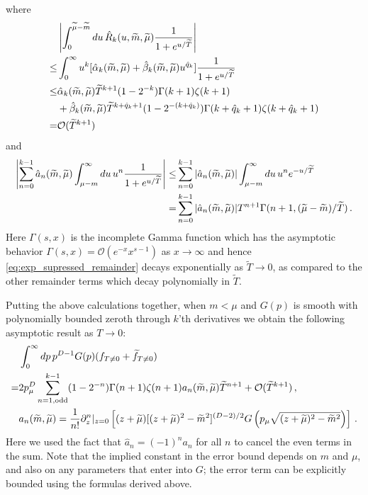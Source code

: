 \documentclass[sn-mathphys,Numbered]{sn-jnl}
\newcommand{\wt}[1]{\widetilde{#1}}
\begin{document}
where
\begin{align}
&\left|\int_0^{\wt{\mu}-\wt{m}} du\, \hat{R}_k(u,\wt{m},\wt{\mu})\frac{1}{1+e^{u/\wt{T}}}\right|\\
\leq &\int_0^\infty u^k[\hat{\alpha}_k(\wt{m},\wt{\mu})+\hat{\beta}_k(\wt{m},\wt{\mu}) u^{\hat{q}_k}]\frac{1}{1+e^{u/\wt{T}}}\notag\\
\leq&\hat{\alpha}_k(\wt{m},\wt{\mu}) \wt{T}^{k+1}(1-2^{-k})\Gamma(k+1)\zeta(k+1)\notag\\
  &+\hat{\beta}_k(\wt{m},\wt{\mu}) \wt{T}^{k+\hat{q}_k+1}(1-2^{-(k+\hat{q}_k)})\Gamma(k+\hat{q}_k+1)\zeta(k+\hat{q}_k+1) \notag\\
  =&\mathcal{O}(\wt{T}^{k+1})\notag
\end{align}
and
\begin{align}\label{eq:exp_supressed_remainder}
\left|\sum_{n=0}^{k-1} \hat{a}_{n}(\wt{m},\wt{\mu})\int_{\mu-m}^\infty du\, u^n  \frac{1}{1+e^{u/\wt{T}}}\right|
\leq&\sum_{n=0}^{k-1} |\hat{a}_{n}(\wt{m},\wt{\mu})|\int_{\mu-m}^\infty du\, u^n  e^{-u/\wt{T}}\\
=&\sum_{n=0}^{k-1} |\hat{a}_{n}(\wt{m},\wt{\mu})|T^{n+1}\Gamma(n+1,(\wt{\mu}-\wt{m})/\wt{T})\,.\notag
\end{align}
Here $\Gamma(s,x)$ is the incomplete Gamma function which has the asymptotic behavior $\Gamma(s,x)=\mathcal{O}(e^{-x}x^{s-1})$ as $x\to\infty$ and hence \eqref{eq:exp_supressed_remainder} decays exponentially as $\wt{T}\to 0$, as compared to the other remainder terms which decay polynomially in $\wt{T}$.  

Putting the above calculations together, when $m<\mu$ and $G(p)$ is smooth with polynomially bounded zeroth through $k$'th derivatives we obtain the following asymptotic result as $T\to 0$:
\begin{align}
    &\int_0^\infty dp\, p^{D-1} G(p)(f_{T\neq 0}+\widetilde{f}_{T\neq 0})\\
    =& 2p_\mu^D\sum_{n=1, \text{odd}}^{k-1} 
        (1-2^{-n})\Gamma(n+1)\zeta(n+1){a}_n(\wt{m},\wt{\mu})\wt{T}^{n+1}+ \mathcal{O}(\wt{T}^{k+1})\,,\notag\\
        &a_n(\wt{m},\wt{\mu})=\frac{1}{n!}\partial_z^n|_{z=0} \left[(z+\wt{\mu})[(z+\wt{\mu})^2-\wt{m}^2]^{(D-2)/2} G\left(p_\mu\sqrt{(z+\wt{\mu})^2-\wt{m}^2}\right)\right]\,.\notag
\end{align}
Here we used the fact that   $\hat{a}_n=(-1)^n{a}_n$ for all $n$ to cancel the even terms in the sum. Note that the implied constant in the error bound depends on $m$ and $\mu$, and also on any parameters that enter into $G$; the error term can be explicitly bounded using the  formulas derived above.
\end{document}
